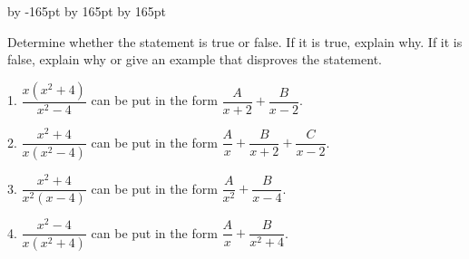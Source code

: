 \documentclass{sebase}
\newenvironment{instructions}{\STARTINSTR}{\ENDINSTR}
\begin{document}
\vspace*{-9pt}%
\setlength{\columnsep}{24pt}
\advance \leftskip by -165pt
\advance\hsize by 165pt
\advance\linewidth by 165pt
\begin{multicols}{2}%

\begin{instructions}
{\small Determine whether the statement is true or false. If it is true,
explain why. If it is false, explain why or give an example that disproves
the statement.}
\end{instructions}

\begin{ExerciseList}
\item[\hfill 1.] $\dfrac{x(x^{2}+4)}{x^{2}-4}$ can be put in the form $%
\dfrac{A}{x+2}+\dfrac{B}{x-2}$.

%

%

\item[\hfill 2.] $\dfrac{x^{2}+4}{x(x^{2}-4)}$ can be put in the form $%
\dfrac{A}{x}+\dfrac{B}{x+2}+\dfrac{C}{x-2}$.

%

\item[\hfill 3.] $\dfrac{x^{2}+4}{x^{2}(x-4)}$ can be put in the form $%
\dfrac{A}{x^{2}}+\dfrac{B}{x-4}$.

%

%

\item[\hfill 4.] $\dfrac{x^{2}-4}{x(x^{2}+4)}$ can be put in the form $%
\dfrac{A}{x}+\dfrac{B}{x^{2}+4}$.


\end{ExerciseList}
\end{multicols}
\end{document}
